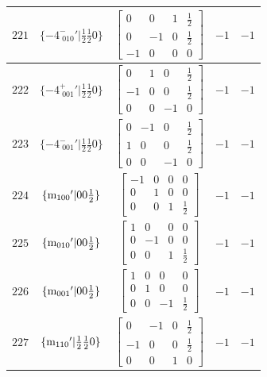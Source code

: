 \documentclass[fleqn,8pt]{jsarticle}
\begin{document}
\begin{longtable}{ccccc}
$ 221 $ & $ \{-4^{-}_{\,\,010}{}'|\frac{1}{2} \frac{1}{2} 0\} $ & $ \begin{bmatrix} 0 & 0 & 1 & \frac{1}{2} \\ 0 & -1 & 0 & \frac{1}{2} \\ -1 & 0 & 0 & 0 \end{bmatrix} $ & $ -1 $ & $ -1 $ \\ \hline
$ 222 $ & $ \{-4^{+}_{\,\,001}{}'|\frac{1}{2} \frac{1}{2} 0\} $ & $ \begin{bmatrix} 0 & 1 & 0 & \frac{1}{2} \\ -1 & 0 & 0 & \frac{1}{2} \\ 0 & 0 & -1 & 0 \end{bmatrix} $ & $ -1 $ & $ -1 $ \\ \hline
$ 223 $ & $ \{-4^{-}_{\,\,001}{}'|\frac{1}{2} \frac{1}{2} 0\} $ & $ \begin{bmatrix} 0 & -1 & 0 & \frac{1}{2} \\ 1 & 0 & 0 & \frac{1}{2} \\ 0 & 0 & -1 & 0 \end{bmatrix} $ & $ -1 $ & $ -1 $ \\ \hline
$ 224 $ & $ \{{\rm m}_{100}{}'|0 0 \frac{1}{2}\} $ & $ \begin{bmatrix} -1 & 0 & 0 & 0 \\ 0 & 1 & 0 & 0 \\ 0 & 0 & 1 & \frac{1}{2} \end{bmatrix} $ & $ -1 $ & $ -1 $ \\ \hline
$ 225 $ & $ \{{\rm m}_{010}{}'|0 0 \frac{1}{2}\} $ & $ \begin{bmatrix} 1 & 0 & 0 & 0 \\ 0 & -1 & 0 & 0 \\ 0 & 0 & 1 & \frac{1}{2} \end{bmatrix} $ & $ -1 $ & $ -1 $ \\ \hline
$ 226 $ & $ \{{\rm m}_{001}{}'|0 0 \frac{1}{2}\} $ & $ \begin{bmatrix} 1 & 0 & 0 & 0 \\ 0 & 1 & 0 & 0 \\ 0 & 0 & -1 & \frac{1}{2} \end{bmatrix} $ & $ -1 $ & $ -1 $ \\ \hline
$ 227 $ & $ \{{\rm m}_{110}{}'|\frac{1}{2} \frac{1}{2} 0\} $ & $ \begin{bmatrix} 0 & -1 & 0 & \frac{1}{2} \\ -1 & 0 & 0 & \frac{1}{2} \\ 0 & 0 & 1 & 0 \end{bmatrix} $ & $ -1 $ & $ -1 $ \\ \hline

\end{longtable}
\end{document}
